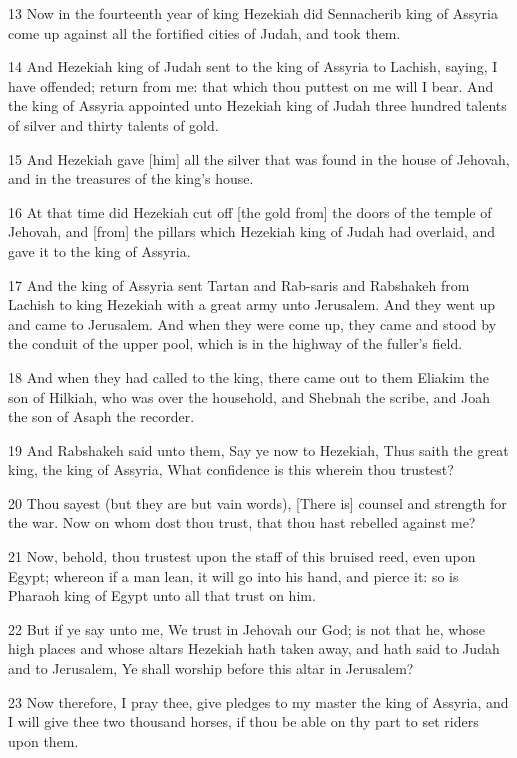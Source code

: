 \par 13 Now in the fourteenth year of king Hezekiah did Sennacherib king of Assyria come up against all the fortified cities of Judah, and took them.
\par 14 And Hezekiah king of Judah sent to the king of Assyria to Lachish, saying, I have offended; return from me: that which thou puttest on me will I bear. And the king of Assyria appointed unto Hezekiah king of Judah three hundred talents of silver and thirty talents of gold.
\par 15 And Hezekiah gave [him] all the silver that was found in the house of Jehovah, and in the treasures of the king's house.
\par 16 At that time did Hezekiah cut off [the gold from] the doors of the temple of Jehovah, and [from] the pillars which Hezekiah king of Judah had overlaid, and gave it to the king of Assyria.
\par 17 And the king of Assyria sent Tartan and Rab-saris and Rabshakeh from Lachish to king Hezekiah with a great army unto Jerusalem. And they went up and came to Jerusalem. And when they were come up, they came and stood by the conduit of the upper pool, which is in the highway of the fuller's field.
\par 18 And when they had called to the king, there came out to them Eliakim the son of Hilkiah, who was over the household, and Shebnah the scribe, and Joah the son of Asaph the recorder.
\par 19 And Rabshakeh said unto them, Say ye now to Hezekiah, Thus saith the great king, the king of Assyria, What confidence is this wherein thou trustest?
\par 20 Thou sayest (but they are but vain words), [There is] counsel and strength for the war. Now on whom dost thou trust, that thou hast rebelled against me?
\par 21 Now, behold, thou trustest upon the staff of this bruised reed, even upon Egypt; whereon if a man lean, it will go into his hand, and pierce it: so is Pharaoh king of Egypt unto all that trust on him.
\par 22 But if ye say unto me, We trust in Jehovah our God; is not that he, whose high places and whose altars Hezekiah hath taken away, and hath said to Judah and to Jerusalem, Ye shall worship before this altar in Jerusalem?
\par 23 Now therefore, I pray thee, give pledges to my master the king of Assyria, and I will give thee two thousand horses, if thou be able on thy part to set riders upon them.
